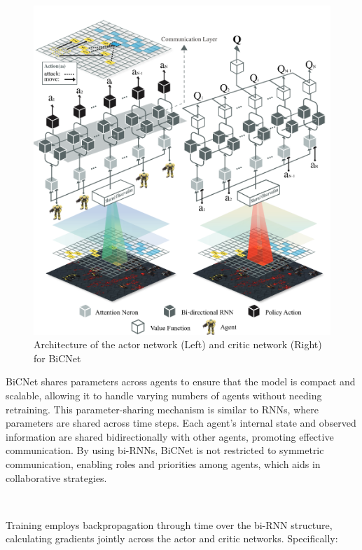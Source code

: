 \documentclass{article}
\begin{document}
\begin{figure}
	\centering
	\includegraphics[scale=0.5]{images/bicnet}
	\caption{Architecture of the actor network (Left) and critic network (Right) for BiCNet \citep{peng2017bicnet}}
	\label{fig:ic3net.png}
\end{figure}

BiCNet shares parameters across agents to ensure that the model is compact and scalable, allowing it to handle varying numbers of agents without needing retraining. This parameter-sharing mechanism is similar to RNNs, where parameters are shared across time steps. Each agent’s internal state and observed information are shared bidirectionally with other agents, promoting effective communication. By using bi-RNNs, BiCNet is not restricted to symmetric communication, enabling roles and priorities among agents, which aids in collaborative strategies.

\

Training employs backpropagation through time \citep{werbos1990backpropagation} over the bi-RNN structure, calculating gradients jointly across the actor and critic networks. Specifically:
\end{document}
